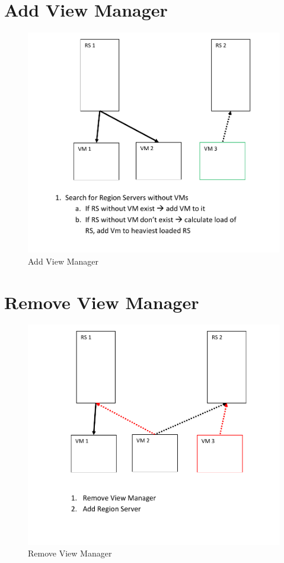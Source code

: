 \section{Add View Manager}
\begin{figure}[h!]
  \centering
    \includegraphics[scale=0.8]{figures/LB_AddViewManager}
     \caption{Add View Manager}
    \label{fig:lb_addviewmanager}
\end{figure}
\newpage

\section{Remove View Manager}
\begin{figure}[h!]
  \centering
    \includegraphics[scale=0.8]{figures/LB_RemoveViewManager}
     \caption{Remove View Manager}
    \label{fig:lb_removeviewmanager}
\end{figure}
\newpage

